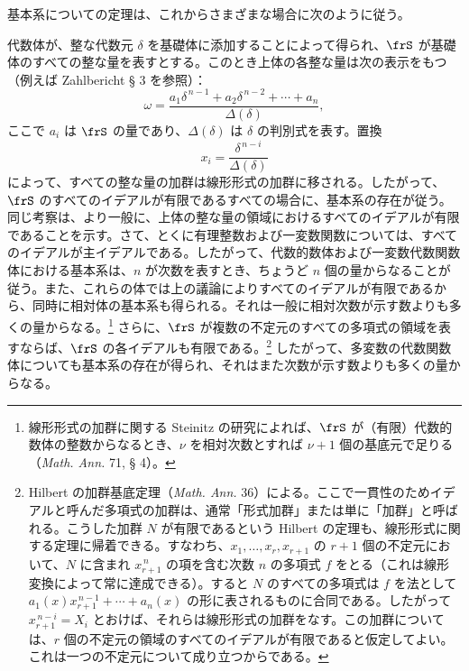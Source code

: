 \documentclass[11pt]{article}
\begin{document}
基本系についての定理は、これからさまざまな場合に次のように従う。

代数体が、整な代数元 \(\delta\) を基礎体に添加することによって得られ、\(\frS\) が基礎体のすべての整な量を表すとする。このとき上体の各整な量は次の表示をもつ（例えば Zahlbericht § 3 を参照）：
\[
\omega=\frac{a_1\delta^{\,n-1}+a_2\delta^{\,n-2}+\cdots+a_n}{\Delta(\delta)},
\]
ここで \(a_i\) は \(\frS\) の量であり、\(\Delta(\delta)\) は \(\delta\) の判別式を表す。置換
\[
x_i=\frac{\delta^{\,n-i}}{\Delta(\delta)}
\]
によって、すべての整な量の加群は線形形式の加群に移される。したがって、\(\frS\) のすべてのイデアルが有限であるすべての場合に、基本系の存在が従う。同じ考察は、より一般に、上体の整な量の領域におけるすべてのイデアルが有限であることを示す。さて、とくに有理整数および一変数関数については、すべてのイデアルが主イデアルである。したがって、代数的数体および一変数代数関数体における基本系は、\(n\) が次数を表すとき、ちょうど \(n\) 個の量からなることが従う。また、これらの体では上の議論によりすべてのイデアルが有限であるから、同時に相対体の基本系も得られる。それは一般に相対次数が示す数よりも多くの量からなる。\footnote{線形形式の加群に関する Steinitz の研究によれば、\(\frS\) が（有限）代数的数体の整数からなるとき、\(\nu\) を相対次数とすれば \(\nu+1\) 個の基底元で足りる（\emph{Math. Ann.} 71, § 4）。} さらに、\(\frS\) が複数の不定元のすべての多項式の領域を表すならば、\(\frS\) の各イデアルも有限である。\footnote{Hilbert の加群基底定理（\emph{Math. Ann.} 36）による。ここで一貫性のためイデアルと呼んだ多項式の加群は、通常「形式加群」または単に「加群」と呼ばれる。こうした加群 \(N\) が有限であるという Hilbert の定理も、線形形式に関する定理に帰着できる。すなわち、\(x_1,\ldots,x_r,x_{r+1}\) の \(r+1\) 個の不定元において、\(N\) に含まれ \(x_{r+1}^{\,n}\) の項を含む次数 \(n\) の多項式 \(f\) をとる（これは線形変換によって常に達成できる）。すると \(N\) のすべての多項式は \(f\) を法として \(a_1(x)x_{r+1}^{\,n-1}+\cdots+a_n(x)\) の形に表されるものに合同である。したがって \(x_{r+1}^{\,n-i}=X_i\) とおけば、それらは線形形式の加群をなす。この加群については、\(r\) 個の不定元の領域のすべてのイデアルが有限であると仮定してよい。これは一つの不定元について成り立つからである。} したがって、多変数の代数関数体についても基本系の存在が得られ、それはまた次数が示す数よりも多くの量からなる。
\end{document}
